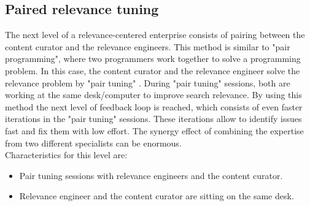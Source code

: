 \subsection{Paired relevance tuning}
\label{ref:qa:orga:pairedrelevancetuning}
The next level of a relevance-centered enterprise consists of pairing between the content curator and the relevance engineers.
This method is similar to "pair programming", where two programmers work together to solve a programming problem.
In this case, the content curator and the relevance engineer solve the relevance problem by "pair tuning" \cite[see][P. 270-272]{relevant_search_2016}.
During "pair tuning" sessions, both are working at the same desk/computer to improve search relevance.
By using this method the next level of feedback loop is reached,
which consists of even faster iterations in the "pair tuning" sessions.
These iterations allow to identify issues fast and fix them with low effort.
The synergy effect of combining the expertise from two different specialists can be enormous.\\
Characteristics for this level are:
\begin{itemize}
	\item Pair tuning sessions with relevance engineers and the content curator.
	\item Relevance engineer and the content curator are sitting on the same desk.
\end{itemize}


